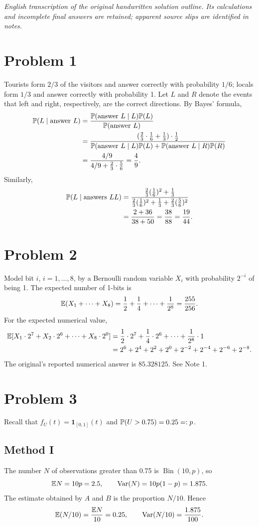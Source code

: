 \documentclass[11pt,a4paper]{article}
\begin{document}
\noindent\emph{English transcription of the original handwritten solution outline. Its calculations and incomplete final answers are retained; apparent source slips are identified in notes.}

\section*{Problem 1}
Tourists form $2/3$ of the visitors and answer correctly with probability $1/6$; locals form $1/3$ and answer correctly with probability 1. Let $L$ and $R$ denote the events that left and right, respectively, are the correct directions.
By Bayes' formula,
\begin{align*}
\P(L\mid\text{answer }L)
&=\frac{\P(\text{answer }L\mid L)\P(L)}{\P(\text{answer }L)}\\
&=\frac{(\frac23\cdot\frac16+\frac13)\cdot\frac12}
{\P(\text{answer }L\mid L)\P(L)+\P(\text{answer }L\mid R)\P(R)}\\
&=\frac{4/9}{4/9+\frac23\cdot\frac56}=\frac49.
\end{align*}
Similarly,
\begin{align*}
\P(L\mid\text{answers }LL)
&=\frac{\frac23(\frac16)^2+\frac13}
{\frac23(\frac16)^2+\frac13+\frac23(\frac56)^2}\\
&=\frac{2+36}{38+50}=\frac{38}{88}=\frac{19}{44}.
\end{align*}

\section*{Problem 2}
Model bit $i$, $i=1,\ldots,8$, by a Bernoulli random variable $X_i$ with probability $2^{-i}$ of being 1. The expected number of 1-bits is
\[
\E(X_1+\cdots+X_8)=\frac12+\frac14+\cdots+\frac1{2^8}=\frac{255}{256}.
\]
For the expected numerical value,
\begin{align*}
\E[X_1\cdot2^7+X_2\cdot2^6+\cdots+X_8\cdot2^0]
&=\frac12\cdot2^7+\frac14\cdot2^6+\cdots+\frac1{2^8}\cdot1\\
&=2^6+2^4+2^2+2^0+2^{-2}+2^{-4}+2^{-6}+2^{-8}.
\end{align*}
The original's reported numerical answer is $85.328125$. See Note 1.

\section*{Problem 3}
Recall that $f_U(t)=\mathbf1_{[0,1]}(t)$ and $\P(U>0.75)=0.25=:p$.
\subsection*{Method I}
The number $N$ of observations greater than 0.75 is $\operatorname{Bin}(10,p)$, so
\[
\E N=10p=2.5,\qquad \operatorname{Var}(N)=10p(1-p)=1.875.
\]
The estimate obtained by $A$ and $B$ is the proportion $N/10$. Hence
\[
\E(N/10)=\frac{\E N}{10}=0.25,
\qquad \operatorname{Var}(N/10)=\frac{1.875}{100}.
\]
\end{document}
